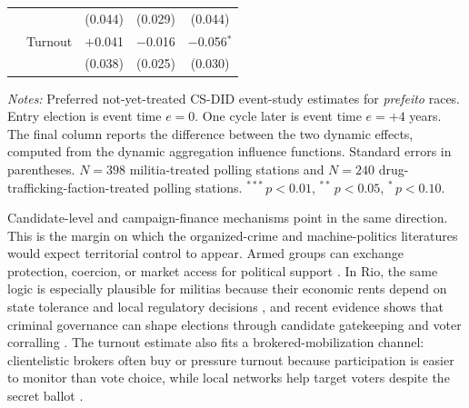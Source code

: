 \documentclass[11pt]{article}
\newcommand{\tabnotes}[1]{\par\vspace{3pt}\noindent\begin{minipage}{\linewidth}\footnotesize #1\end{minipage}}
\begin{document}
\begin{table}[H]
\begin{tabular}{@{}llccc@{}}
        &                   & (0.044)          & (0.029)          & (0.044) \\
        & Turnout           & $+$0.041         & $-$0.016         & $-$0.056$^{*}$ \\
        &                   & (0.038)          & (0.025)          & (0.030) \\
\bottomrule
\end{tabular}
\tabnotes{\textit{Notes:} Preferred not-yet-treated CS-DID event-study estimates for \emph{prefeito} races. Entry election is event time $e=0$. One cycle later is event time $e=+4$ years. The final column reports the difference between the two dynamic effects, computed from the dynamic aggregation influence functions. Standard errors in parentheses. $N=398$ militia-treated polling stations and $N=240$ drug-trafficking-faction-treated polling stations. $^{***}\,p<0.01$, $^{**}\,p<0.05$, $^{*}\,p<0.10$.}
\end{table}

Candidate-level and campaign-finance mechanisms point in the same direction. This is the margin on which the organized-crime and machine-politics literatures would expect territorial control to appear. Armed groups can exchange protection, coercion, or market access for political support \citep{dalbo2006plata, defeo2017mafia, acemoglu2013monopoly, alesina2019organized}. In Rio, the same logic is especially plausible for militias because their economic rents depend on state tolerance and local regulatory decisions \citep{monteiro2023enterprises, pantaleao2025elections}, and recent evidence shows that criminal governance can shape elections through candidate gatekeeping and voter corralling \citep{trudeau2025criminal}. The turnout estimate also fits a brokered-mobilization channel: clientelistic brokers often buy or pressure turnout because participation is easier to monitor than vote choice, while local networks help target voters despite the secret ballot \citep{nichter2008turnout, finan2012reciprocity}.
\end{document}
